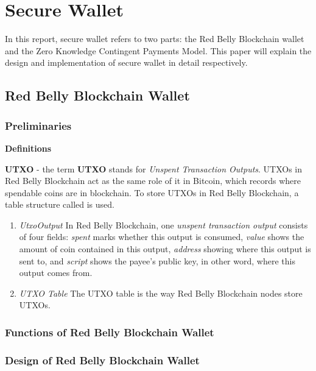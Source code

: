 \documentclass[12pt]{article}
\begin{document}
\section{Secure Wallet}

In this report, secure wallet refers to two parts: the Red Belly Blockchain wallet and the Zero Knowledge Contingent Payments Model. This paper will explain the design and implementation of secure wallet in detail respectively.

\subsection{Red Belly Blockchain Wallet}

\subsubsection{Preliminaries}

\textbf{Definitions}

\textbf{UTXO} - the term \textbf{UTXO} stands for \textit{Unspent Transaction Outputs}. UTXOs in Red Belly Blockchain act as the same role of it in Bitcoin, which records where spendable coins are in blockchain. To store UTXOs in Red Belly Blockchain, a table structure called  is used.

\begin{enumerate}
    \item \textit{UtxoOutput} In Red Belly Blockchain, one \textit{unspent transaction output} consists of four fields: \textit{spent} marks whether this output is consumed, \textit{value} shows the amount of coin contained in this output, \textit{address} showing where this output is sent to, and \textit{script} shows the payee's public key, in other word, where this output comes from.

    \item \textit{UTXO Table} The UTXO table is the way Red Belly Blockchain nodes store UTXOs. 
    
\end{enumerate}

\subsubsection{Functions of Red Belly Blockchain Wallet}

\subsubsection{Design of Red Belly Blockchain Wallet}
\end{document}
